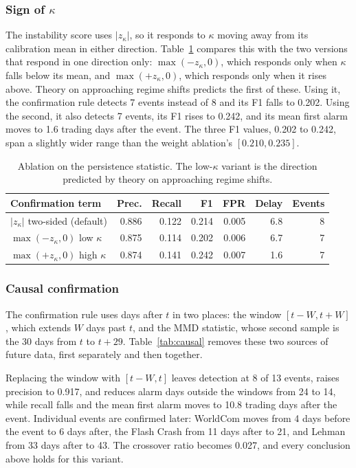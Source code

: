 \documentclass[pdflatex,sn-mathphys-num,iicol]{sn-jnl}
\begin{document}
\subsubsection{Sign of $\kappa$}
\label{sec:kappasign}
The instability score uses $|z_\kappa|$, so it responds to $\kappa$ moving away from its calibration mean in either direction. Table~\ref{tab:kappasign} compares this with the two versions that respond in one direction only: $\max(-z_\kappa,0)$, which responds only when $\kappa$ falls below its mean, and $\max(+z_\kappa,0)$, which responds only when it rises above. Theory on approaching regime shifts predicts the first of these. Using it, the confirmation rule detects 7 events instead of 8 and its F1 falls to 0.202. Using the second, it also detects 7 events, its F1 rises to 0.242, and its mean first alarm moves to 1.6 trading days after the event. The three F1 values, 0.202 to 0.242, span a slightly wider range than the weight ablation's $[0.210,0.235]$.

\begin{table}[t]
\centering
\caption{Ablation on the persistence statistic. The low-$\kappa$ variant is the direction predicted by theory on approaching regime shifts.}
\label{tab:kappasign}
\scriptsize
\begin{tabular}{lrrrrrr}
\toprule
Confirmation term & Prec. & Recall & F1 & FPR & Delay & Events\\
\midrule
$|z_\kappa|$ two-sided (default) & 0.886 & 0.122 & 0.214 & 0.005 & 6.8 & 8\\
$\max(-z_\kappa,0)$ low $\kappa$ & 0.875 & 0.114 & 0.202 & 0.006 & 6.7 & 7\\
$\max(+z_\kappa,0)$ high $\kappa$ & 0.874 & 0.141 & 0.242 & 0.007 & 1.6 & 7\\
\bottomrule
\end{tabular}
\end{table}

\subsubsection{Causal confirmation}
\label{sec:causal}
The confirmation rule uses days after $t$ in two places: the window $[t-W,t+W]$, which extends $W$ days past $t$, and the MMD statistic, whose second sample is the 30 days from $t$ to $t+29$. Table~\ref{tab:causal} removes these two sources of future data, first separately and then together.

Replacing the window with $[t-W,t]$ leaves detection at 8 of 13 events, raises precision to 0.917, and reduces alarm days outside the windows from 24 to 14, while recall falls and the mean first alarm moves to 10.8 trading days after the event. Individual events are confirmed later: WorldCom moves from 4 days before the event to 6 days after, the Flash Crash from 11 days after to 21, and Lehman from 33 days after to 43. The crossover ratio becomes 0.027, and every conclusion above holds for this variant.
\end{document}
